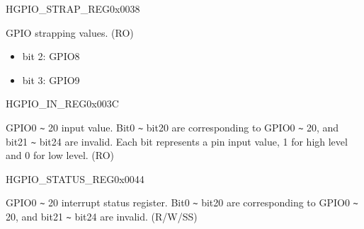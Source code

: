 \begin{register}{H}{GPIO\_STRAP\_REG}{0x0038}\label{regdesc:GPIOSTRAPREG}
%
%
\regnewline%
\begin{regdesc}\begin{reglist}
\label{fielddesc:GPIOSTRAPPING}\item [GPIO\_STRAPPING] GPIO strapping values. (RO)
\begin{itemize}
    \item bit 2: GPIO8
    \item bit 3: GPIO9
\end{itemize}
\end{reglist}\end{regdesc}
\end{register}


\begin{register}{H}{GPIO\_IN\_REG}{0x003C}\label{regdesc:GPIOINREG}
%
%
\regnewline%
\begin{regdesc}\begin{reglist}
\label{fielddesc:GPIOINDATANEXT}\item [GPIO\_IN\_DATA\_NEXT] GPIO0 \verb+~+ 20 input value. Bit0 \verb+~+ bit20 are corresponding to GPIO0 \verb+~+ 20, and bit21 \verb+~+ bit24 are invalid. Each bit represents a pin input value, 1 for high level and 0 for low level. (RO)
\end{reglist}\end{regdesc}
\end{register}


\begin{register}{H}{GPIO\_STATUS\_REG}{0x0044}\label{regdesc:GPIOSTATUSREG}
%
%
\regnewline%
\begin{regdesc}\begin{reglist}
\label{fielddesc:GPIOSTATUSINTERRUPT}\item [GPIO\_STATUS\_INTERRUPT] GPIO0 \verb+~+ 20 interrupt status register. Bit0 \verb+~+ bit20 are corresponding to GPIO0 \verb+~+ 20, and bit21 \verb+~+ bit24 are invalid. (R/W/SS)
\end{reglist}\end{regdesc}
\end{register}


